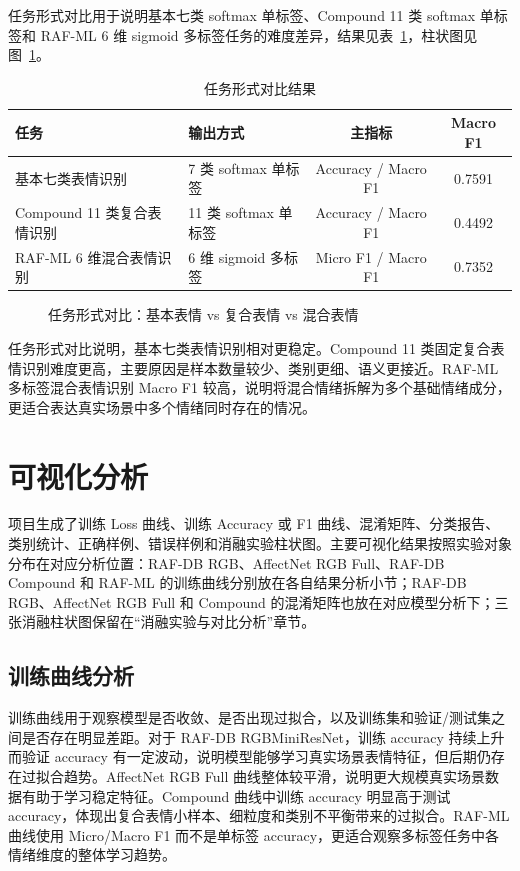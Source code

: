 \documentclass[UTF8,a4paper,12pt]{ctexart}
\newcommand{\figplaceholder}[1]{%
  \begin{center}
    \fbox{\parbox{0.78\textwidth}{\centering #1}}
  \end{center}
}
\begin{document}
任务形式对比用于说明基本七类 softmax 单标签、Compound 11 类 softmax 单标签和 RAF-ML 6 维 sigmoid 多标签任务的难度差异，结果见表~\ref{tab:task_comparison}，柱状图见图~\ref{fig:task_comparison}。

\begin{table}[H]
  \centering
  \caption{任务形式对比结果}
  \label{tab:task_comparison}
  \begin{tabular}{llcc}
    \toprule
    任务 & 输出方式 & 主指标 & Macro F1 \\
    \midrule
    基本七类表情识别 & 7 类 softmax 单标签 & Accuracy / Macro F1 & 0.7591 \\
    Compound 11 类复合表情识别 & 11 类 softmax 单标签 & Accuracy / Macro F1 & 0.4492 \\
    RAF-ML 6 维混合表情识别 & 6 维 sigmoid 多标签 & Micro F1 / Macro F1 & 0.7352 \\
    \bottomrule
  \end{tabular}
\end{table}

\begin{figure}[H]
  \centering
  \figplaceholder{\rule{0pt}{1.2em}}
  \caption{任务形式对比：基本表情 vs 复合表情 vs 混合表情}
  \label{fig:task_comparison}
\end{figure}

任务形式对比说明，基本七类表情识别相对更稳定。Compound 11 类固定复合表情识别难度更高，主要原因是样本数量较少、类别更细、语义更接近。RAF-ML 多标签混合表情识别 Macro F1 较高，说明将混合情绪拆解为多个基础情绪成分，更适合表达真实场景中多个情绪同时存在的情况。

\section{可视化分析}

项目生成了训练 Loss 曲线、训练 Accuracy 或 F1 曲线、混淆矩阵、分类报告、类别统计、正确样例、错误样例和消融实验柱状图。主要可视化结果按照实验对象分布在对应分析位置：RAF-DB RGB、AffectNet RGB Full、RAF-DB Compound 和 RAF-ML 的训练曲线分别放在各自结果分析小节；RAF-DB RGB、AffectNet RGB Full 和 Compound 的混淆矩阵也放在对应模型分析下；三张消融柱状图保留在“消融实验与对比分析”章节。

\subsection{训练曲线分析}

训练曲线用于观察模型是否收敛、是否出现过拟合，以及训练集和验证/测试集之间是否存在明显差距。对于 RAF-DB RGBMiniResNet，训练 accuracy 持续上升而验证 accuracy 有一定波动，说明模型能够学习真实场景表情特征，但后期仍存在过拟合趋势。AffectNet RGB Full 曲线整体较平滑，说明更大规模真实场景数据有助于学习稳定特征。Compound 曲线中训练 accuracy 明显高于测试 accuracy，体现出复合表情小样本、细粒度和类别不平衡带来的过拟合。RAF-ML 曲线使用 Micro/Macro F1 而不是单标签 accuracy，更适合观察多标签任务中各情绪维度的整体学习趋势。
\end{document}
